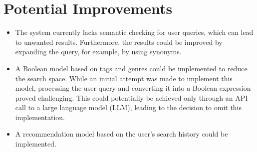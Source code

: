 \documentclass{llncs}
\begin{document}
\section{Potential Improvements}

\begin{itemize}
    \item The system currently lacks semantic checking for user queries, which can lead to unwanted results. Furthermore, the results could be improved by expanding the query, for example, by using synonyms.
    \item A Boolean model based on tags and genres could be implemented to reduce the search space. While an initial attempt was made to implement this model, processing the user query and converting it into a Boolean expression proved challenging. This could potentially be achieved only through an API call to a large language model (LLM), leading to the decision to omit this implementation.
    \item A recommendation model based on the user's search history could be implemented.
\end{itemize}
\end{document}
